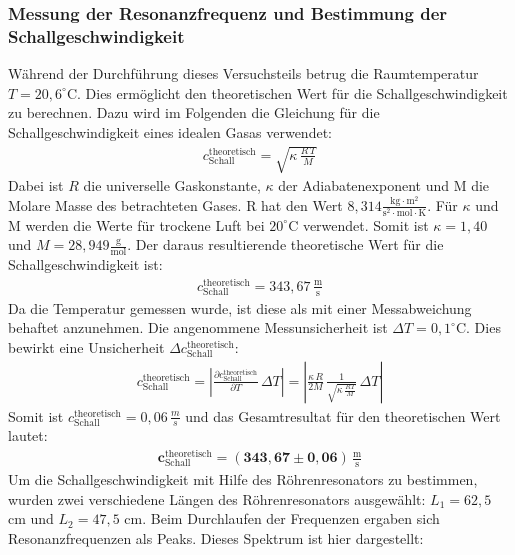 \documentclass[german,  %
parskip=full,  %
]{scrartcl}
\begin{document}
\subsubsection{Messung der Resonanzfrequenz und Bestimmung der Schallgeschwindigkeit}
Während der Durchführung dieses Versuchsteils betrug die Raumtemperatur $T=20,6^{\circ} \mathrm{C}$. Dies ermöglicht den theoretischen Wert für die Schallgeschwindigkeit zu berechnen. Dazu wird im Folgenden die Gleichung für die Schallgeschwindigkeit eines idealen Gasas verwendet:
\begin{align}
c_{\mathrm{Schall}}^{\mathrm{theoretisch}} = \sqrt{\kappa \, \frac{R\, T}{M}}
\end{align}
Dabei ist $R$ die universelle Gaskonstante, $\kappa$ der Adiabatenexponent und M die Molare Masse des betrachteten Gases. R hat den Wert $8,314 \frac{\mathrm{kg} \cdot \mathrm{m}^2}{\mathrm{s}^2 \cdot \mathrm{mol} \cdot \mathrm{K}}$.
Für $\kappa$ und M werden die Werte für trockene Luft bei $20^{\circ}\mathrm{C}$ verwendet. Somit ist $\kappa=1,40$ und $M=28,949 \frac{\mathrm{g}}{\mathrm{mol}}$. Der daraus resultierende theoretische Wert für die Schallgeschwindigkeit ist:
\begin{align}
c_{\mathrm{Schall}}^{\mathrm{theoretisch}}=343,67 \, \frac{\mathrm{m}}{\mathrm{s}}
\end{align}
Da die Temperatur gemessen wurde, ist diese als mit einer Messabweichung behaftet anzunehmen. Die angenommene Messunsicherheit ist $\Delta T=0,1^{\circ} \mathrm{C}$. Dies bewirkt eine Unsicherheit $\Delta c_{\mathrm{Schall}}^{\mathrm{theoretisch}}$:
\begin{align}
c_{\mathrm{Schall}}^{\mathrm{theoretisch}} = \left| \frac{\partial c_{\mathrm{Schall}}^{\mathrm{theoretisch}}}{\partial T} \, \Delta T \right| =\left| \frac{\kappa \, R}{2M}\, \frac{1}{\sqrt{\kappa \, \frac{RT}{M}}} \, \Delta T \right| 
\end{align}
Somit ist $c_{\mathrm{Schall}}^{\mathrm{theoretisch}}=0,06\, \frac{m}{s}$ und das Gesamtresultat für den theoretischen Wert lautet:
\begin{align}
\boldsymbol{c_{\mathrm{Schall}}^{\mathrm{theoretisch}} = (343,67 \pm 0,06) \, \frac{\mathrm{m}}{\mathrm{s}}}
\end{align}
\newline
\newline Um die Schallgeschwindigkeit mit Hilfe des Röhrenresonators zu bestimmen, wurden zwei verschiedene Längen des Röhrenresonators ausgewählt: $L_1=62,5$ cm und $L_{2}=47,5$ cm. Beim Durchlaufen der Frequenzen ergaben sich Resonanzfrequenzen als Peaks. Dieses Spektrum ist hier dargestellt: 
\end{document}
